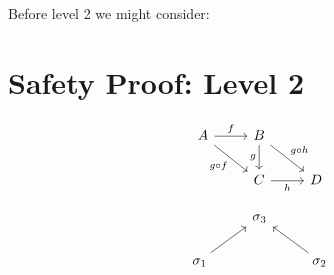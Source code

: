 \documentclass{article}
\theoremstyle{definition}
\begin{document}
\pagebreak
\pagebreak



Before level 2 we might consider:

\section{Safety Proof: Level 2}



\begin{equation}
\begin{tikzcd}
A \arrow[r,"f"]
  \arrow[dr,swap,"g\circ f"]
  &
B \arrow[dr,"g\circ h"]
  \arrow[d,swap,"g"]
  \\
  {}&
C \arrow[r,swap,"h"]
  &
D
\end{tikzcd}
\end{equation}


\begin{equation*}
\begin{tikzcd}
{}
  &
\sigma_3
  &
{}
  \\ 
\sigma_1
  \arrow[ur,""]
  &
{}
  &
\sigma_2
  \arrow[ul,""]
\end{tikzcd}
\end{equation*}



\fi
\end{document}
